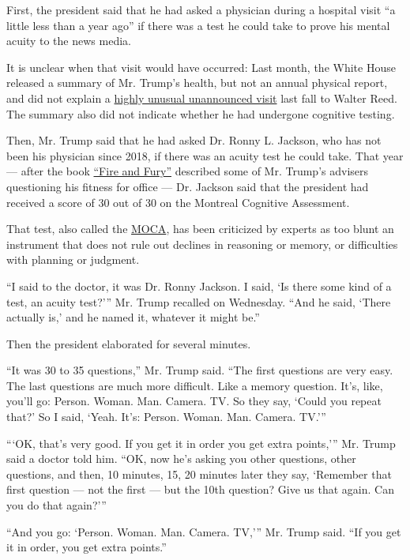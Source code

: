 First, the president said that he had asked a physician during a
hospital visit ``a little less than a year ago'' if there was a test he
could take to prove his mental acuity to the news media.

It is unclear when that visit would have occurred: Last month, the White
House released a summary of Mr. Trump's health, but not an annual
physical report, and did not explain a
\href{https://www.nytimes.com/2020/06/03/us/politics/trump-physical-hydroxychloroquine.html}{highly
unusual unannounced visit} last fall to Walter Reed. The summary also
did not indicate whether he had undergone cognitive testing.

Then, Mr. Trump said that he had asked Dr. Ronny L. Jackson, who has not
been his physician since 2018, if there was an acuity test he could
take. That year --- after the book
\href{https://www.nytimes.com/2018/01/08/books/review/michael-wolff-fire-and-fury-trump-white-house.html}{``Fire
and Fury''} described some of Mr. Trump's advisers questioning his
fitness for office --- Dr. Jackson said that the president had received
a score of 30 out of 30 on the Montreal Cognitive Assessment.

That test, also called the
\href{https://www.nytimes.com/article/trump-cognitive-test.html}{MOCA},
has been criticized by experts as too blunt an instrument that does not
rule out declines in reasoning or memory, or difficulties with planning
or judgment.

``I said to the doctor, it was Dr. Ronny Jackson. I said, `Is there some
kind of a test, an acuity test?''' Mr. Trump recalled on Wednesday.
``And he said, `There actually is,' and he named it, whatever it might
be.''

Then the president elaborated for several minutes.

``It was 30 to 35 questions,'' Mr. Trump said. ``The first questions are
very easy. The last questions are much more difficult. Like a memory
question. It's, like, you'll go: Person. Woman. Man. Camera. TV. So they
say, `Could you repeat that?' So I said, `Yeah. It's: Person. Woman.
Man. Camera. TV.'''

```OK, that's very good. If you get it in order you get extra points,'''
Mr. Trump said a doctor told him. ``OK, now he's asking you other
questions, other questions, and then, 10 minutes, 15, 20 minutes later
they say, `Remember that first question --- not the first --- but the
10th question? Give us that again. Can you do that again?'''

``And you go: `Person. Woman. Man. Camera. TV,''' Mr. Trump said. ``If
you get it in order, you get extra points.''

